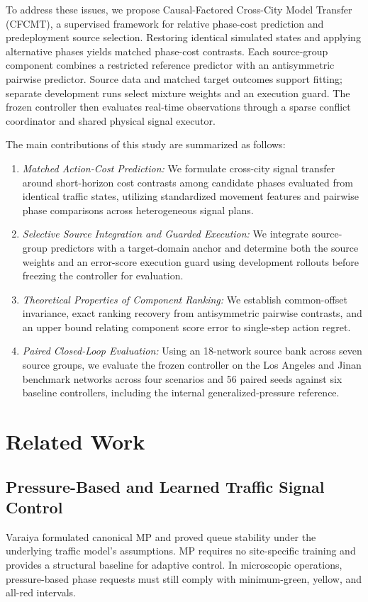 \documentclass[letterpaper,journal]{IEEEtran}
\begin{document}
To address these issues, we propose Causal-Factored Cross-City Model Transfer (CFCMT), a supervised framework for relative phase-cost prediction and predeployment source selection. Restoring identical simulated states and applying alternative phases yields matched phase-cost contrasts. Each source-group component combines a restricted reference predictor with an antisymmetric pairwise predictor. Source data and matched target outcomes support fitting; separate development runs select mixture weights and an execution guard. The frozen controller then evaluates real-time observations through a sparse conflict coordinator and shared physical signal executor.

The main contributions of this study are summarized as follows:
\begin{enumerate}
    \item \textit{Matched Action-Cost Prediction:} We formulate cross-city signal transfer around short-horizon cost contrasts among candidate phases evaluated from identical traffic states, utilizing standardized movement features and pairwise phase comparisons across heterogeneous signal plans.
    \item \textit{Selective Source Integration and Guarded Execution:} We integrate source-group predictors with a target-domain anchor and determine both the source weights and an error-score execution guard using development rollouts before freezing the controller for evaluation.
    \item \textit{Theoretical Properties of Component Ranking:} We establish common-offset invariance, exact ranking recovery from antisymmetric pairwise contrasts, and an upper bound relating component score error to single-step action regret.
    \item \textit{Paired Closed-Loop Evaluation:} Using an 18-network source bank across seven source groups, we evaluate the frozen controller on the Los Angeles and Jinan benchmark networks across four scenarios and 56 paired seeds against six baseline controllers, including the internal generalized-pressure reference.
\end{enumerate}

\section{Related Work}
\label{sec:related}

\subsection{Pressure-Based and Learned Traffic Signal Control}
Varaiya \cite{varaiya2013maxpressure} formulated canonical MP and proved queue stability under the underlying traffic model's assumptions. MP requires no site-specific training and provides a structural baseline for adaptive control. In microscopic operations, pressure-based phase requests must still comply with minimum-green, yellow, and all-red intervals.
\end{document}
